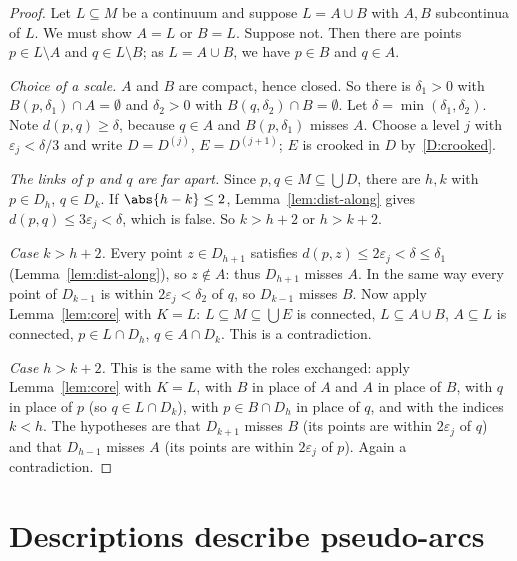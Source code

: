 \begin{proof}
Let $L\subseteq M$ be a continuum and suppose $L=A\cup B$ with $A,B$ subcontinua of $L$. We must
show $A=L$ or $B=L$. Suppose not. Then there are points $p\in L\setminus A$ and $q\in L\setminus
B$; as $L=A\cup B$, we have $p\in B$ and $q\in A$.

\emph{Choice of a scale.} $A$ and $B$ are compact, hence closed. So there is $\delta_1>0$ with
$B(p,\delta_1)\cap A=\emptyset$ and $\delta_2>0$ with $B(q,\delta_2)\cap B=\emptyset$. Let
$\delta=\min(\delta_1,\delta_2)$. Note $d(p,q)\ge\delta$, because $q\in A$ and $B(p,\delta_1)$ misses
$A$. Choose a level $j$ with $\varepsilon_j<\delta/3$ and write $D=D^{(j)}$, $E=D^{(j+1)}$; $E$ is
crooked in $D$ by~\ref{D:crooked}.

\emph{The links of $p$ and $q$ are far apart.} Since $p,q\in M\subseteq\bigcup D$, there are $h,k$
with $p\in D_h$, $q\in D_k$. If $\abs{h-k}\le2$, Lemma~\ref{lem:dist-along} gives $d(p,q)\le
3\varepsilon_j<\delta$, which is false. So $k>h+2$ or $h>k+2$.

\emph{Case $k>h+2$.} Every point $z\in D_{h+1}$ satisfies $d(p,z)\le2\varepsilon_j<\delta\le
\delta_1$ (Lemma~\ref{lem:dist-along}), so $z\notin A$: thus $D_{h+1}$ misses $A$. In the same way
every point of $D_{k-1}$ is within $2\varepsilon_j<\delta_2$ of $q$, so $D_{k-1}$ misses $B$. Now
apply Lemma~\ref{lem:core} with $K=L$: $L\subseteq M\subseteq\bigcup E$ is connected, $L\subseteq
A\cup B$, $A\subseteq L$ is connected, $p\in L\cap D_h$, $q\in A\cap D_k$. This is a contradiction.

\emph{Case $h>k+2$.} This is the same with the roles exchanged: apply Lemma~\ref{lem:core} with
$K=L$, with $B$ in place of $A$ and $A$ in place of $B$, with $q$ in place of $p$ (so $q\in L\cap
D_k$), with $p\in B\cap D_h$ in place of $q$, and with the indices $k<h$. The hypotheses are
that $D_{k+1}$ misses $B$ (its points are within $2\varepsilon_j$ of $q$) and that $D_{h-1}$
misses $A$ (its points are within $2\varepsilon_j$ of $p$). Again a contradiction.
\end{proof}


\section{Descriptions describe pseudo-arcs}

